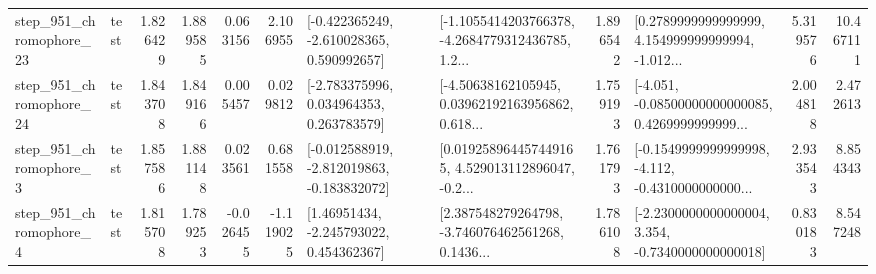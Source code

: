 \begin{tabular}{llrrrrllrlrr}
  step\_951\_chromophore\_23 &      test &      1.826429 &    1.889585 &      0.063156 &  2.106955 &   [-0.422365249, -2.610028365, 0.590992657] &  [-1.1055414203766378, -4.2684779312436785, 1.2... &       1.896542 &  [0.2789999999999999, 4.154999999999994, -1.012... &            5.319576 &         10.467111 \\
  step\_951\_chromophore\_24 &      test &      1.843708 &    1.849166 &      0.005457 &  0.029812 &    [-2.783375996, 0.034964353, 0.263783579] &  [-4.50638162105945, 0.03962192163956862, 0.618... &       1.759193 &  [-4.051, -0.08500000000000085, 0.4269999999999... &            2.004818 &          2.472613 \\
   step\_951\_chromophore\_3 &      test &      1.857586 &    1.881148 &      0.023561 &  0.681558 &  [-0.012588919, -2.812019863, -0.183832072] &  [0.019258964457449165, 4.529013112896047, -0.2... &       1.761793 &  [-0.1549999999999998, -4.112, -0.4310000000000... &            2.933543 &          8.854343 \\
   step\_951\_chromophore\_4 &      test &      1.815708 &    1.789253 &     -0.026455 & -1.119025 &     [1.46951434, -2.245793022, 0.454362367] &  [2.387548279264798, -3.746076462561268, 0.1436... &       1.786108 &  [-2.2300000000000004, 3.354, -0.7340000000000018] &            0.830183 &          8.547248 \\
\bottomrule
\end{tabular}


